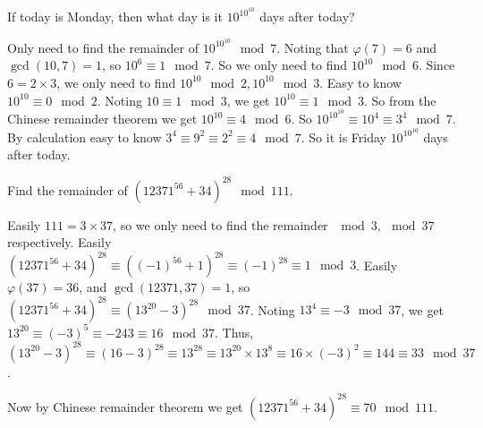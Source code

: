 \documentclass{ctexart}
\renewcommand{\phi}{\varphi}
\begin{document}
\begin{problem}\label{pro:45.1}
  If today is Monday, then what day is it \(10^{10^{10}}\) days after today?
\end{problem}
\begin{solution}
  Only need to find the remainder of \(10^{10^{10} } \mod 7\).
  Noting that \(\phi(7)=6\) and \(\gcd(10,7)=1\), so \(10^6 \equiv 1 \mod 7\).
  So we only need to find \(10^{10} \mod 6\).
  Since \(6 = 2 \times 3\), we only need to find \(10^{10} \mod 2,10^{10} \mod 3\).
  Easy to know \(10^{10} \equiv 0 \mod 2\).
  Noting \(10 \equiv 1 \mod 3\), we get \(10^{10} \equiv 1 \mod 3\).
  So from the Chinese remainder theorem we get \(10^{10} \equiv 4 \mod 6\).
  So \(10^{10^{10} }\equiv 10^4 \equiv 3^4\mod 7\).
  By calculation easy to know \(3^4 \equiv 9^2 \equiv 2^2 \equiv 4 \mod 7\).
  So it is Friday \(10^{10^{10} }\) days after today.
\end{solution}

\begin{problem}\label{pro:45.2}
  Find the remainder of \((12371^{56} + 34)^{28} \mod 111 \).
\end{problem}
\begin{solution}
  Easily \(111=3 \times 37\), so we only need to find the remainder \(\mod 3,\mod 37\) respectively.
  Easily \((12371^{56} + 34)^{28} \equiv ((-1)^{56} + 1)^{28} \equiv (-1)^{28} \equiv 1 \mod 3\).
  Easily \(\phi(37)=36\), and \(\gcd(12371,37)=1\), so
  \((12371^{56} + 34)^{28} \equiv (13^{20} -3)^{28} \mod 37\).
  Noting \(13^4 \equiv -3 \mod 37\), we get
  \(13^{20} \equiv (-3)^5 \equiv -243 \equiv 16 \mod 37\).
  Thus, \((13^{20} -3)^{28} \equiv (16-3)^{28} \equiv 13^{28} \equiv 13^{20} \times 13^8 \equiv 16 \times (-3)^2 \equiv 144 \equiv 33 \mod 37\).

  Now by Chinese remainder theorem we get \((12371^{56} +34)^{28} \equiv 70 \mod 111\).
\end{solution}
\end{document}
